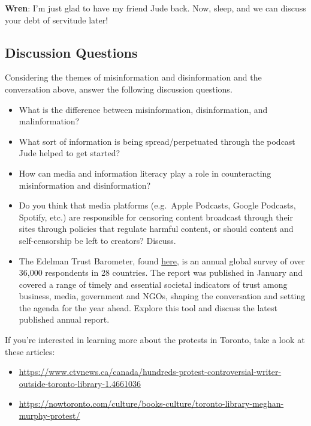 \documentclass[
  letterpaper,
  DIV=11,
  numbers=noendperiod]{scrreprt}
\begin{document}
\textbf{Wren}: I'm just glad to have my friend Jude back. Now, sleep,
and we can discuss your debt of servitude later!

\subsection{Discussion Questions}\label{discussion-questions-5}

Considering the themes of misinformation and disinformation and the
conversation above, answer the following discussion questions.

\begin{itemize}
\item
  What is the difference between misinformation, disinformation, and
  malinformation?
\item
  What sort of information is being spread/perpetuated through the
  podcast Jude helped to get started?
\item
  How can media and information literacy play a role in counteracting
  misinformation and disinformation?
\item
  Do you think that media platforms (e.g.~Apple Podcasts, Google
  Podcasts, Spotify, etc.) are responsible for censoring content
  broadcast through their sites through policies that regulate harmful
  content, or should content and self-censorship be left to creators?
  Discuss.
\item
  The Edelman Trust Barometer, found
  \href{https://www.edelman.com/trust/2022-trust-barometer}{here}, is an
  annual global survey of over 36,000 respondents in 28 countries. The
  report was published in January and covered a range of timely and
  essential societal indicators of trust among business, media,
  government and NGOs, shaping the conversation and setting the agenda
  for the year ahead. Explore this tool and discuss the latest published
  annual report.
\end{itemize}

\begin{tcolorbox}[enhanced jigsaw, arc=.35mm, bottomrule=.15mm, bottomtitle=1mm, breakable, colback=white, colbacktitle=quarto-callout-note-color!10!white, colframe=quarto-callout-note-color-frame, coltitle=black, left=2mm, leftrule=.75mm, opacityback=0, opacitybacktitle=0.6, rightrule=.15mm, title=\textcolor{quarto-callout-note-color}{\faInfo}\hspace{0.5em}{Note}, titlerule=0mm, toprule=.15mm, toptitle=1mm]

If you're interested in learning more about the protests in Toronto,
take a look at these articles:

\begin{itemize}
\item
  \url{https://www.ctvnews.ca/canada/hundreds-protest-controversial-writer-outside-toronto-library-1.4661036}
\item
  \url{https://nowtoronto.com/culture/books-culture/toronto-library-meghan-murphy-protest/}
\end{itemize}

\end{tcolorbox}
\end{document}
